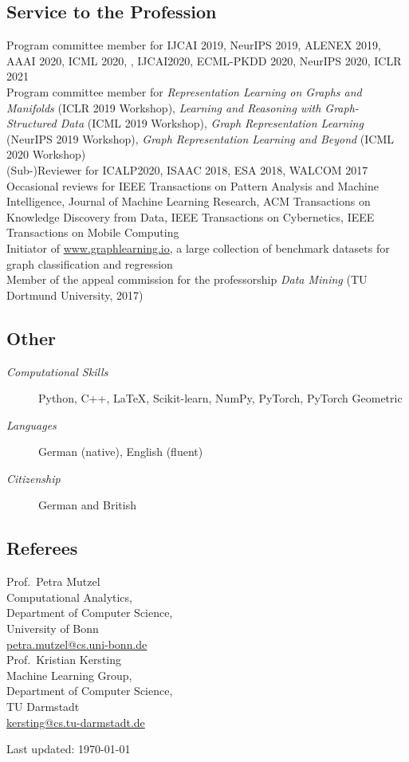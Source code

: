 \documentclass[11pt, a4paper]{scrartcl}
\begin{document}
\subsection*{Service to the Profession}
Program committee member for IJCAI 2019, NeurIPS  2019, ALENEX 2019, AAAI 2020, ICML 2020, , IJCAI2020, ECML-PKDD 2020,  NeurIPS 2020, ICLR 2021\\

Program committee member for \emph{Representation Learning on Graphs and Manifolds} (ICLR 2019 Workshop), \emph{Learning and Reasoning with Graph-Structured Data} (ICML 2019 Workshop), \emph{Graph Representation Learning} (NeurIPS 2019 Workshop), \emph{Graph Representation Learning and Beyond} (ICML 2020 Workshop)\\

(Sub-)Reviewer for ICALP2020, ISAAC 2018, ESA 2018, WALCOM 2017 \\

Occasional reviews for IEEE Transactions on Pattern Analysis and Machine Intelligence, Journal of Machine Learning Research, ACM Transactions on Knowledge Discovery from Data, IEEE Transactions on Cybernetics, IEEE Transactions on Mobile Computing\\

Initiator of \url{www.graphlearning.io}, a large collection of benchmark datasets for graph classification and regression\\

Member of the appeal commission for the professorship \emph{Data Mining} (TU Dortmund University, 2017)

\subsection*{Other}
\begin{description}
	\item[\em Computational Skills] Python, C++, \LaTeX, Scikit-learn, NumPy, PyTorch, PyTorch Geometric
	\item[\em Languages] German (native), English (fluent)
	\item[\em Citizenship] German and British
\end{description}

\subsection*{Referees}
Prof.~Petra Mutzel\\
Computational Analytics,\\ 
Department of Computer Science,\\
University of Bonn \\
\href{mailto:petra.mutzel@cs.uni-bonn.de}{petra.mutzel@cs.uni-bonn.de}\\


Prof.~Kristian Kersting\\ 
Machine Learning Group,\\
Department of Computer Science,\\
TU Darmstadt\\
\href{mailto:kersting@cs.tu-darmstadt.de}{kersting@cs.tu-darmstadt.de}\\

\vfill{} 
\begin{center}
{\scriptsize Last updated: \today}
\end{center}
\end{document}
